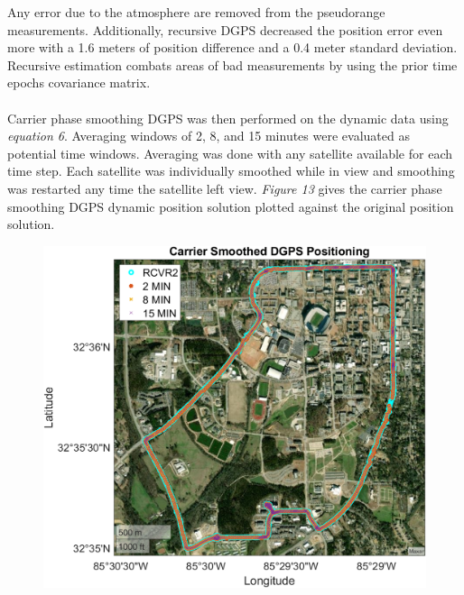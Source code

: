 \documentclass[11pt]{article}
\begin{document}
\begin{enumerate}[label=\textbf{\arabic*.}]
      Any error due to the atmosphere are removed from the pseudorange measurements. 
      Additionally, recursive DGPS decreased the position error even more with a 1.6 meters 
      of position difference and a 0.4 meter standard deviation. Recursive estimation combats 
      areas of bad measurements by using the prior time epochs covariance matrix. 
      \\ \\
      Carrier phase smoothing DGPS was then performed on the dynamic data using 
      \emph{equation 6}. Averaging windows of 2, 8, and 15 minutes were evaluated as 
      potential time windows. Averaging was done with any satellite available for each time 
      step. Each satellite was individually smoothed while in view and smoothing was 
      restarted any time the satellite left view. \emph{Figure 13} gives the carrier phase 
      smoothing DGPS dynamic position solution plotted against the original position 
      solution.
      \begin{figure}[H]
        \centering
        \begin{minipage}[b]{0.49\textwidth}
          \includegraphics[width=\textwidth]{p3_c.png}
        \end{minipage}
        \begin{minipage}[b]{0.49\textwidth}

\end{minipage}
\end{figure}
\end{enumerate}
\end{document}
